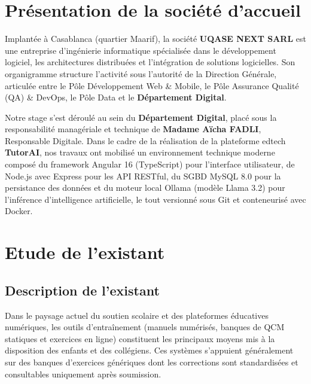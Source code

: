 \documentclass[12pt,a4paper]{report}
\begin{document}
\section{Présentation de la société d'accueil}
Implantée à Casablanca (quartier Maarif), la société \textbf{UQASE NEXT SARL} est une entreprise d'ingénierie informatique spécialisée dans le développement logiciel, les architectures distribuées et l'intégration de solutions logicielles. Son organigramme structure l'activité sous l'autorité de la Direction Générale, articulée entre le Pôle Développement Web \& Mobile, le Pôle Assurance Qualité (QA) \& DevOps, le Pôle Data et le \textbf{Département Digital}.

Notre stage s'est déroulé au sein du \textbf{Département Digital}, placé sous la responsabilité managériale et technique de \textbf{Madame Aïcha FADLI}, Responsable Digitale. Dans le cadre de la réalisation de la plateforme edtech \textbf{TutorAI}, nos travaux ont mobilisé un environnement technique moderne composé du framework Angular 16 (TypeScript) pour l'interface utilisateur, de Node.js avec Express pour les API RESTful, du SGBD MySQL 8.0 pour la persistance des données et du moteur local Ollama (modèle Llama 3.2) pour l'inférence d'intelligence artificielle, le tout versionné sous Git et conteneurisé avec Docker.

\section{Etude de l'existant}

\subsection{Description de l'existant}
Dans le paysage actuel du soutien scolaire et des plateformes éducatives numériques, les outils d'entraînement (manuels numérisés, banques de QCM statiques et exercices en ligne) constituent les principaux moyens mis à la disposition des enfants et des collégiens. Ces systèmes s'appuient généralement sur des banques d'exercices génériques dont les corrections sont standardisées et consultables uniquement après soumission.
\end{document}

